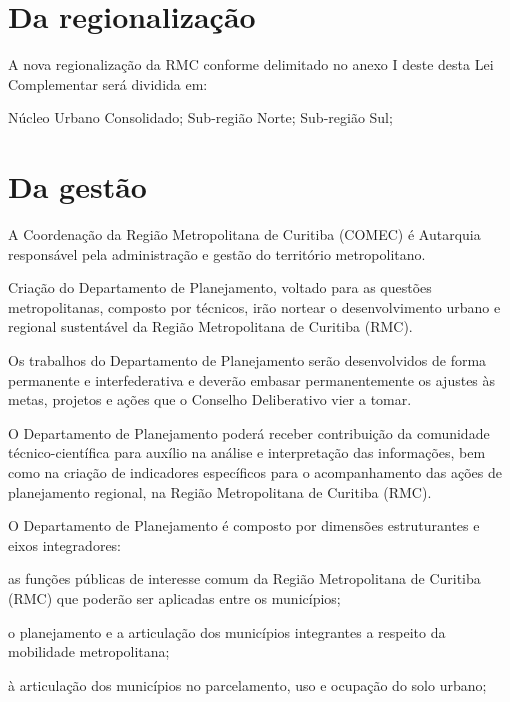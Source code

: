 \documentclass[capitulo]{br-lex-2017}
\begin{document}

\chapter{Da regionalização}

\artigo A nova regionalização da RMC conforme delimitado no anexo I deste desta Lei Complementar será dividida em:

\inciso Núcleo Urbano Consolidado;
\inciso Sub-região Norte;
\inciso Sub-região Sul;

\chapter{Da gestão}

\artigo A Coordenação da Região Metropolitana de Curitiba (COMEC) é Autarquia responsável pela administração e gestão do território metropolitano.

\artigo Criação do Departamento de Planejamento, voltado para as questões metropolitanas, composto por técnicos, irão nortear o desenvolvimento urbano e regional sustentável da Região Metropolitana de Curitiba (RMC).

	\paragrafo Os trabalhos do Departamento de Planejamento serão desenvolvidos de forma permanente e interfederativa e  deverão embasar permanentemente os ajustes às metas, projetos e ações que o Conselho Deliberativo vier a tomar.
	
	\paragrafo O Departamento de Planejamento poderá receber contribuição da comunidade técnico-científica para auxílio na análise e interpretação das informações, bem como na criação de indicadores específicos para o acompanhamento das ações de planejamento regional, na Região Metropolitana de Curitiba (RMC).
	
	\paragrafo O Departamento de Planejamento é composto por dimensões estruturantes e eixos integradores:
	
		\inciso as funções públicas de interesse comum da Região Metropolitana de Curitiba (RMC) que poderão ser aplicadas entre os municípios;
		
		\inciso o planejamento e a articulação dos municípios integrantes a respeito da mobilidade metropolitana;
		
		\inciso à articulação dos municípios no parcelamento, uso e ocupação do solo urbano;
		
\end{document}
